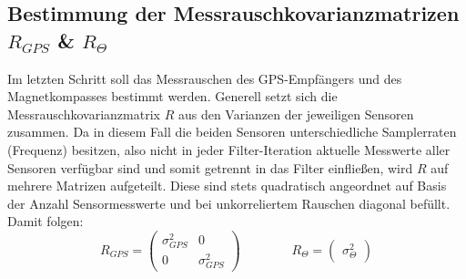 \documentclass[12pt,a4paper]{article}
\begin{document}
	\subsection{Bestimmung der Messrauschkovarianzmatrizen $R_{GPS}$ \& $R_{\Theta}$}\label{subsec:Messrauschkovarianzmatrizen}
	Im letzten Schritt soll das Messrauschen des GPS-Empfängers und des Magnetkompasses bestimmt werden. Generell setzt sich die Messrauschkovarianzmatrix $R$ aus den Varianzen der jeweiligen Sensoren zusammen. Da in diesem Fall die beiden Sensoren unterschiedliche Samplerraten (Frequenz) besitzen, also nicht in jeder Filter-Iteration aktuelle Messwerte aller Sensoren verfügbar sind und somit getrennt in das Filter einfließen, wird $R$ auf mehrere Matrizen aufgeteilt. Diese sind stets quadratisch angeordnet auf Basis der Anzahl Sensormesswerte und bei unkorreliertem Rauschen diagonal befüllt. Damit folgen:
	\begin{equation}
		R_{GPS}=
		\begin{pmatrix}
		\sigma_{GPS}^{2} & 0 \\[0.5em]
		0 & \sigma_{GPS}^{2}
		\end{pmatrix}\qquad\qquad
		R_{\Theta}=
		\begin{pmatrix}
		\sigma_{\Theta}^{2}
		\end{pmatrix}
	\end{equation}
\end{document}
